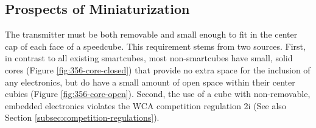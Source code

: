 \subsection{Prospects of Miniaturization}
\label{subsec:prospects-of-miniaturization}
The transmitter must be both removable and small enough to fit in the center cap of each face of a speedcube.
This requirement stems from two sources.
First, in contrast to all existing smartcubes, most non-smartcubes have small, solid cores (Figure \ref{fig:356-core-closed}) that provide no extra space for the inclusion of any electronics, but do have a small amount of open space within their center cubies (Figure \ref{fig:356-core-open}).
Second, the use of a cube with non-removable, embedded electronics violates the WCA competition regulation 2i \cite{wca-regulations} (See also Section \ref{subsec:competition-regulations}).
